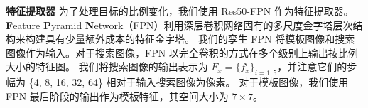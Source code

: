 \textbf{特征提取器} 为了处理目标的比例变化，我们使用 Res50-FPN \cite{lin2017feature} 作为特征提取器。
\textbf{F}eature \textbf{P}yramid \textbf{N}etwork（FPN）利用深层卷积网络固有的多尺度金字塔层次结构来构建具有少量额外成本的特征金字塔。
我们的孪生 FPN 将模板图像和搜索图像作为输入。对于搜索图像，FPN 以完全卷积的方式在多个级别上输出按比例大小的特征图。
我们将搜索图像的输出表示为 $F_{x} = \{f_{x}^i\}_{i=1:5}$，并注意它们的步幅为 \{4, 8, 16, 32, 64\} 相对于输入搜索图像为像素。
对于模板图像，我们使用 FPN 最后阶段的输出作为模板特征，其空间大小为 $7 \times 7$。

